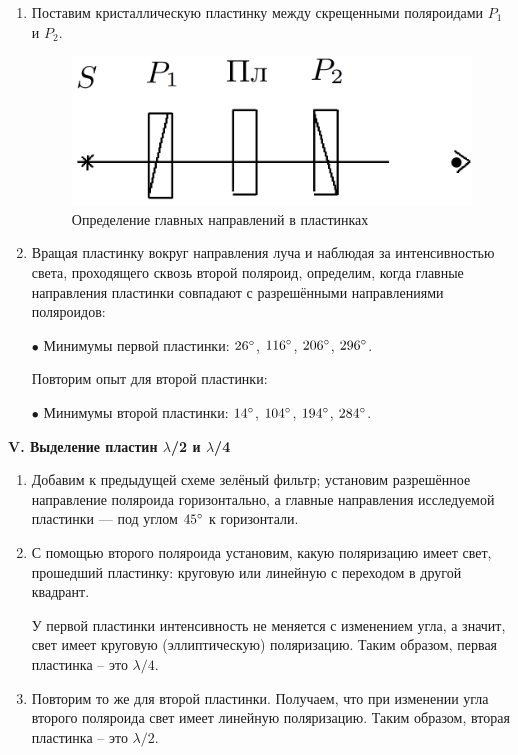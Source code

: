 \documentclass[12pt,a4paper]{article}
\begin{document}
	\begin{enumerate}
		\item Поставим кристаллическую пластинку между скрещенными поляроидами $P_1$ и $P_2$.
		
		\begin{figure}[h!]
			\centering
			\includegraphics[scale=0.5]{res/IV}
			\caption{Определение главных направлений в пластинках}
		\end{figure}
		
		\item Вращая пластинку вокруг направления луча и наблюдая за интенсивностью света, проходящего сквозь второй поляроид, определим, когда главные направления пластинки совпадают с разрешёнными направлениями поляроидов:
		
		\begin{center}
			$\bullet$ Минимумы первой пластинки: $26\degree$, $116\degree$, $206\degree$, $296\degree$.
		\end{center} 
		
		Повторим опыт для второй пластинки:
		
		\begin{center}
			$\bullet$ Минимумы второй пластинки: $14\degree$, $104\degree$, $194\degree$, $284\degree$.
		\end{center}
	\end{enumerate}


	\begin{center}
		\textbf{V. Выделение пластин $\lambda$/2 и $\lambda$/4}
	\end{center}

	\begin{enumerate}
		\item Добавим к предыдущей схеме зелёный фильтр; установим разрешённое направление поляроида горизонтально, а главные направления исследуемой пластинки — под углом $45\degree$ к горизонтали.
		
		\item С помощью второго поляроида установим, какую поляризацию имеет свет, прошедший пластинку: круговую или линейную с переходом в другой квадрант.
		
		У первой пластинки интенсивность не меняется с изменением угла, а значит, свет имеет круговую (эллиптическую)
		поляризацию. Таким образом, первая пластинка -- это $\lambda / 4$.
		
		\item Повторим то же для второй пластинки. Получаем, что при изменении угла второго поляроида свет имеет линейную поляризацию. Таким образом, вторая пластинка -- это $\lambda / 2$.
	\end{enumerate}
\end{document}
